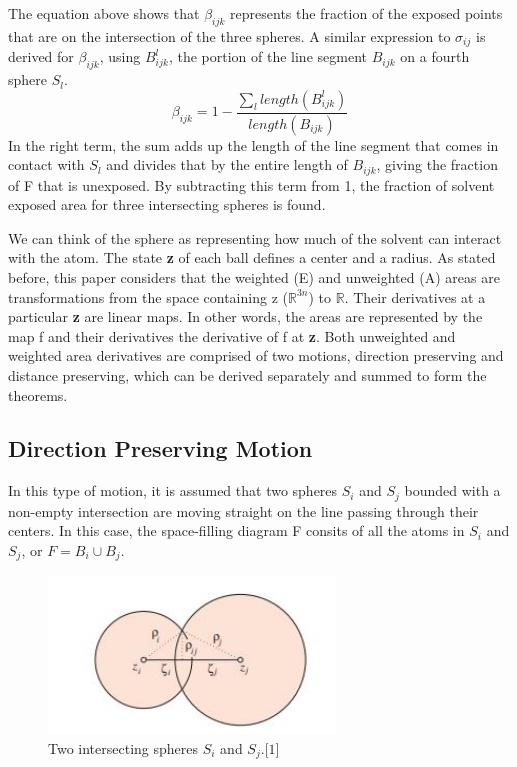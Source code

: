 \documentclass{article}
\newcommand{\R}{\mathbb{R}}
\begin{document}
The equation above shows that $\beta_{ijk}$ represents the fraction of the exposed points that are on the intersection of the three spheres. A similar expression to $\sigma_{ij}$ is derived for $\beta_{ijk}$, using $B^l_{ijk}$, the portion of the line segment $B_{ijk}$ on a fourth sphere $S_l$. 
\begin{equation*}
\beta_{ijk} = 1 - \frac{\sum_{l}length(B^l_{ijk})}{length(B_{ijk})}
\end{equation*}
In the right term, the sum adds up the length of the line segment that comes in contact with $S_l$ and divides that by the entire length of $B_{ijk}$, giving the fraction of F that is unexposed. By subtracting this term from 1, the fraction of solvent exposed area for three intersecting spheres is found.

We can think of the sphere as representing how much of the solvent can interact with the atom. The state \textbf{z} of each ball defines a center and a radius. As stated before, this paper considers that the weighted (E) and unweighted (A) areas are transformations from the space containing z ($\R^{3n}$) to $\R$. Their derivatives at a particular \textbf{z} are linear maps. In other words, the areas are represented by the map f and their derivatives the derivative of f at \textbf{z}. Both unweighted and weighted area derivatives are comprised of two motions, direction preserving and distance preserving, which can be derived separately and summed to form the theorems.
 
\subsection{Direction Preserving Motion} 
In this type of motion, it is assumed that two spheres $S_i$ and $S_j$ bounded with a non-empty intersection are moving straight on the line passing through their centers.
In this case, the space-filling diagram F consits of all the atoms in $S_i$ and $S_j$, or $F = B_i \cup B_j$.

\begin{figure}[h!]
\caption{Two intersecting spheres $S_i$ and $S_j.\lbrack1\rbrack$}
\centerline{\includegraphics[width=3in]{Figure6}}
\end{figure}
\end{document}
